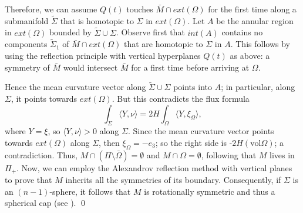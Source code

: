 \documentclass[11pt]{amsart}
\theoremstyle{plain}
\numberwithin{equation}{section}
\numberwithin{theorem}{section}
\begin{document}
Therefore, we can assume $Q(t)$ touches $\bar M\cap ext(\Omega)$ for the first time along a submanifold $\tilde\Sigma$ that is homotopic to $\Sigma$ in $ext(\Omega)$. Let $A$ be the annular region in $ext(\Omega)$ bounded by $\tilde\Sigma\cup \Sigma$. Observe first that $int(A)$ contains no components $\tilde\Sigma_1$ of $\bar M\cap ext(\Omega)$ that are homotopic to $\Sigma$ in $A$. This follows by using the reflection principle with vertical hyperplanes $Q(t)$ as above: a symmetry of $\bar M$ would intersect $\bar M$ for a first time before arriving at $\Omega$.

Hence the mean curvature vector along $\tilde\Sigma\cup \Sigma$ points into $A$; in particular, along $\Sigma$, it points towards $ext(\Omega)$. But this contradicts the flux formula
\[
\int_\Sigma \langle Y, \nu\rangle =2H\int_\Omega \langle Y, \xi_\Omega\rangle,
\]
where $Y = \xi$, so $\langle Y,\nu\rangle > 0$ along $\Sigma$. Since the mean curvature vector points towards $ext(\Omega)$ along $\Sigma$, then $\xi_\Omega = -e_3$; so the right side is -$2H (\textrm{vol}\Omega)$; a contradiction. Thus, $M\cap(\Pi\setminus \bar\Omega)=\emptyset$ and $M\cap \Omega = \emptyset$, following that $M$ lives in $\Pi_+$. Now,  we can employ the Alexandrov reflection method with vertical planes to prove that $M$ inherits all the symmetries of its boundary. Consequently, if $\Sigma$ is an $(n-1)$-sphere, it follows that $M$ is rotationally symmetric and thus a spherical cap (see \cite{Hsiang}).
\qed 



\end{document}
